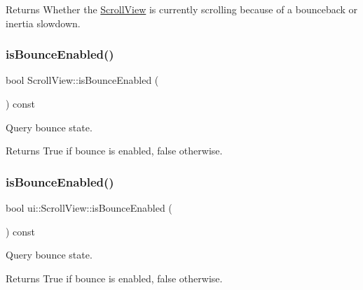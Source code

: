 \begin{DoxyReturn}{Returns}
Whether the \hyperlink{classui_1_1ScrollView}{Scroll\+View} is currently scrolling because of a bounceback or inertia slowdown. 
\end{DoxyReturn}
\mbox{\label{classui_1_1ScrollView_af3426fc20a207cf5e36bd3fc20b65a8e}} 
\subsubsection{\texorpdfstring{is\+Bounce\+Enabled()}{isBounceEnabled()}\hspace{0.1cm}{\footnotesize\ttfamily [1/2]}}
{\footnotesize\ttfamily bool Scroll\+View\+::is\+Bounce\+Enabled (\begin{DoxyParamCaption}{ }\end{DoxyParamCaption}) const}



Query bounce state. 

\begin{DoxyReturn}{Returns}
True if bounce is enabled, false otherwise. 
\end{DoxyReturn}
\mbox{\label{classui_1_1ScrollView_a91e82949b5185d5d49e530d61b77a805}} 
\subsubsection{\texorpdfstring{is\+Bounce\+Enabled()}{isBounceEnabled()}\hspace{0.1cm}{\footnotesize\ttfamily [2/2]}}
{\footnotesize\ttfamily bool ui\+::\+Scroll\+View\+::is\+Bounce\+Enabled (\begin{DoxyParamCaption}{ }\end{DoxyParamCaption}) const}



Query bounce state. 

\begin{DoxyReturn}{Returns}
True if bounce is enabled, false otherwise. 
\end{DoxyReturn}
\mbox{\label{classui_1_1ScrollView_a10a4b20f943bef8175ed053d05921026}} 
